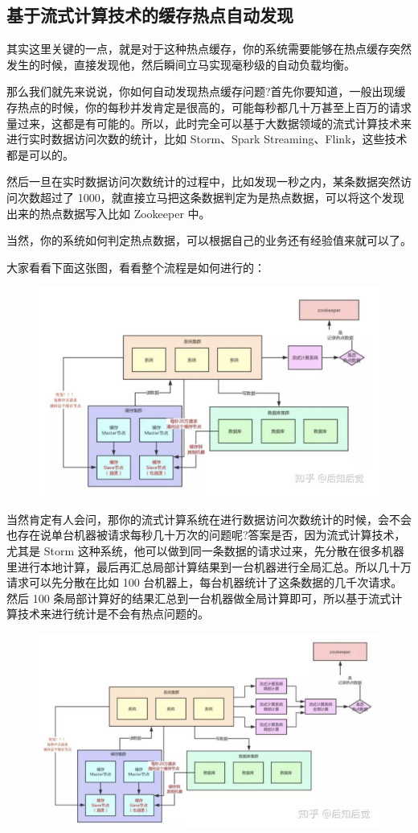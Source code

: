 \documentclass[12pt]{article}
\begin{document}
\subsection{基于流式计算技术的缓存热点自动发现}
其实这里关键的一点，就是对于这种热点缓存，你的系统需要能够在热点缓存突然发生的时候，直接发现他，然后瞬间立马实现毫秒级的自动负载均衡。

那么我们就先来说说，你如何自动发现热点缓存问题?首先你要知道，一般出现缓存热点的时候，你的每秒并发肯定是很高的，可能每秒都几十万甚至上百万的请求量过来，这都是有可能的。所以，此时完全可以基于大数据领域的流式计算技术来进行实时数据访问次数的统计，比如 Storm、Spark Streaming、Flink，这些技术都是可以的。

然后一旦在实时数据访问次数统计的过程中，比如发现一秒之内，某条数据突然访问次数超过了 1000，就直接立马把这条数据判定为是热点数据，可以将这个发现出来的热点数据写入比如 Zookeeper 中。

当然，你的系统如何判定热点数据，可以根据自己的业务还有经验值来就可以了。

大家看看下面这张图，看看整个流程是如何进行的：
\begin{figure}[H]
    \centering
    \includegraphics[width=.8\textwidth]{fig/Cache_Infrastructure_Hot_Key_6.png}
\end{figure}

当然肯定有人会问，那你的流式计算系统在进行数据访问次数统计的时候，会不会也存在说单台机器被请求每秒几十万次的问题呢?答案是否，因为流式计算技术，尤其是 Storm 这种系统，他可以做到同一条数据的请求过来，先分散在很多机器里进行本地计算，最后再汇总局部计算结果到一台机器进行全局汇总。所以几十万请求可以先分散在比如 100 台机器上，每台机器统计了这条数据的几千次请求。然后 100 条局部计算好的结果汇总到一台机器做全局计算即可，所以基于流式计算技术来进行统计是不会有热点问题的。
\begin{figure}[H]
    \centering
    \includegraphics[width=.8\textwidth]{fig/Cache_Infrastructure_Hot_Key_7.png}
\end{figure}
\end{document}
